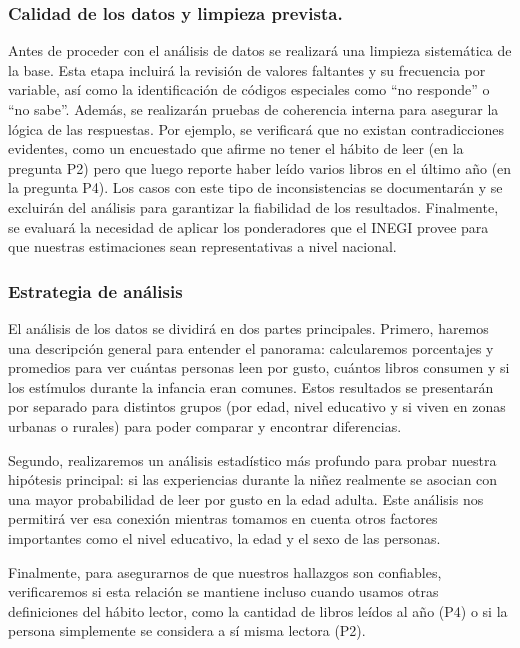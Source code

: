 \documentclass[aps,reprint]{revtex4-2}
\begin{document}
\subsubsection{Calidad de los datos y limpieza prevista.}
Antes de proceder con el análisis de datos se realizará una limpieza sistemática de la base. Esta etapa incluirá la revisión de valores faltantes y su frecuencia por variable, así como la identificación de códigos especiales como “no responde” o “no sabe”. Además, se realizarán pruebas de coherencia interna para asegurar la lógica de las respuestas. Por ejemplo, se verificará que no existan contradicciones evidentes, como un encuestado que afirme no tener el hábito de leer (en la pregunta P2) pero que luego reporte haber leído varios libros en el último año (en la pregunta P4). Los casos con este tipo de inconsistencias se documentarán y se excluirán del análisis para garantizar la fiabilidad de los resultados. Finalmente, se evaluará la necesidad de aplicar los ponderadores que el INEGI provee para que nuestras estimaciones sean representativas a nivel nacional.

\vspace{0.5cm}

\subsubsection{Estrategia de análisis}
El análisis de los datos se dividirá en dos partes principales. Primero, haremos una descripción general para entender el panorama: calcularemos porcentajes y promedios para ver cuántas personas leen por gusto, cuántos libros consumen y si los estímulos durante la infancia eran comunes. Estos resultados se presentarán por separado para distintos grupos (por edad, nivel educativo y si viven en zonas urbanas o rurales) para poder comparar y encontrar diferencias. 

Segundo, realizaremos un análisis estadístico más profundo para probar nuestra hipótesis principal: si las experiencias durante la niñez realmente se asocian con una mayor probabilidad de leer por gusto en la edad adulta. Este análisis nos permitirá ver esa conexión mientras tomamos en cuenta otros factores importantes como el nivel educativo, la edad y el sexo de las personas.

Finalmente, para asegurarnos de que nuestros hallazgos son confiables, verificaremos si esta relación se mantiene incluso cuando usamos otras definiciones del hábito lector, como la cantidad de libros leídos al año (P4) o si la persona simplemente se considera a sí misma lectora (P2).
\end{document}
